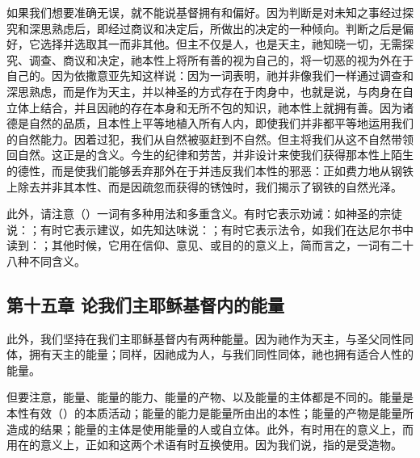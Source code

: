 如果我们想要准确无误，就不能说基督拥有和偏好。因为判断是对未知之事经过探究和深思熟虑后，即经过商议和决定后，所做出的决定的一种倾向。判断之后是偏好，它选择并选取其一而非其他。但主不仅是人，也是天主，祂知晓一切，无需探究、调查、商议和决定，祂本性上将所有善的视为自己的，将一切恶的视为外在于自己的。因为依撒意亚先知这样说：因为一词表明，祂并非像我们一样通过调查和深思熟虑，而是作为天主，并以神圣的方式存在于肉身中，也就是说，与肉身在自立体上结合，并且因祂的存在本身和无所不包的知识，祂本性上就拥有善。因为诸德是自然的品质，且本性上平等地植入所有人内，即使我们并非都平等地运用我们的自然能力。因着过犯，我们从自然被驱赶到不自然。但主将我们从这不自然带领回自然。这正是的含义。今生的纪律和劳苦，并非设计来使我们获得那本性上陌生的德性，而是使我们能够丢弃那外在于并违反我们本性的邪恶：正如费力地从钢铁上除去并非其本性、而是因疏忽而获得的锈蚀时，我们揭示了钢铁的自然光泽。\par

此外，请注意（）一词有多种用法和多重含义。有时它表示劝诫：如神圣的宗徒说：；有时它表示建议，如先知达味说：；有时它表示法令，如我们在达尼尔书中读到：；其他时候，它用在信仰、意见、或目的的意义上，简而言之，一词有二十八种不同含义。\par


\subsection{第十五章 论我们主耶稣基督内的能量}

此外，我们坚持在我们主耶稣基督内有两种能量。因为祂作为天主，与圣父同性同体，拥有天主的能量；同样，因祂成为人，与我们同性同体，祂也拥有适合人性的能量。\par

但要注意，能量、能量的能力、能量的产物、以及能量的主体都是不同的。能量是本性有效（）的本质活动；能量的能力是能量所由出的本性；能量的产物是能量所造成的结果；能量的主体是使用能量的人或自立体。此外，有时用在的意义上，而用在的意义上，正如和这两个术语有时互换使用。因为我们说，指的是受造物。\par


